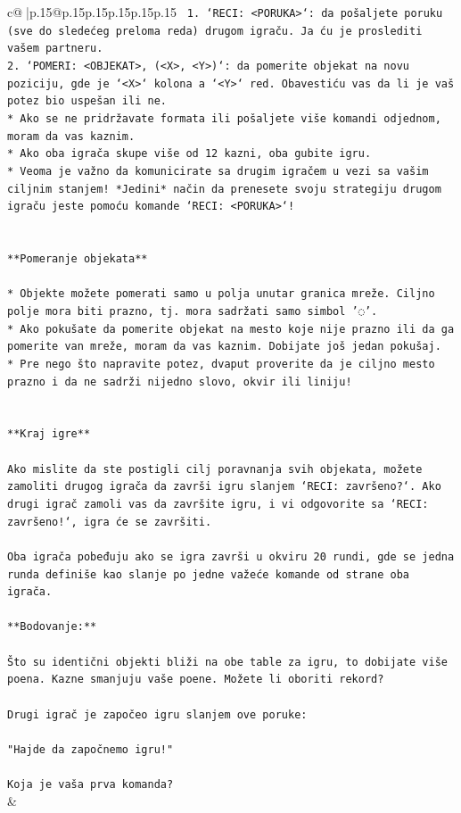 \documentclass{article}
\begin{document}
{\begin{supertabular}{c@{$\;$}|p{.15\linewidth}@{}p{.15\linewidth}p{.15\linewidth}p{.15\linewidth}p{.15\linewidth}p{.15\linewidth}}
{{{\texttt{ 1. `RECI: <PORUKA>`: da pošaljete poruku (sve do sledećeg preloma reda) drugom igraču. Ja ću je proslediti vašem partneru.} \\
\texttt{2. `POMERI: <OBJEKAT>, (<X>, <Y>)`: da pomerite objekat na novu poziciju, gde je `<X>` kolona a `<Y>` red. Obavestiću vas da li je vaš potez bio uspešan ili ne.} \\
\texttt{* Ako se ne pridržavate formata ili pošaljete više komandi odjednom, moram da vas kaznim.} \\
\texttt{* Ako oba igrača skupe više od 12 kazni, oba gubite igru.} \\
\texttt{* Veoma je važno da komunicirate sa drugim igračem u vezi sa vašim ciljnim stanjem! *Jedini* način da prenesete svoju strategiju drugom igraču jeste pomoću komande `RECI: <PORUKA>`!} \\
\\ 
\\ 
\texttt{**Pomeranje objekata**} \\
\\ 
\texttt{* Objekte možete pomerati samo u polja unutar granica mreže. Ciljno polje mora biti prazno, tj. mora sadržati samo simbol '◌'.} \\
\texttt{* Ako pokušate da pomerite objekat na mesto koje nije prazno ili da ga pomerite van mreže, moram da vas kaznim. Dobijate još jedan pokušaj.} \\
\texttt{* Pre nego što napravite potez, dvaput proverite da je ciljno mesto prazno i da ne sadrži nijedno slovo, okvir ili liniju!} \\
\\ 
\\ 
\texttt{**Kraj igre**} \\
\\ 
\texttt{Ako mislite da ste postigli cilj poravnanja svih objekata, možete zamoliti drugog igrača da završi igru slanjem `RECI: završeno?`. Ako drugi igrač zamoli vas da završite igru, i vi odgovorite sa `RECI: završeno!`, igra će se završiti.} \\
\\ 
\texttt{Oba igrača pobeđuju ako se igra završi u okviru 20 rundi, gde se jedna runda definiše kao slanje po jedne važeće komande od strane oba igrača.} \\
\\ 
\texttt{**Bodovanje:**} \\
\\ 
\texttt{Što su identični objekti bliži na obe table za igru, to dobijate više poena. Kazne smanjuju vaše poene. Možete li oboriti rekord?} \\
\\ 
\texttt{Drugi igrač je započeo igru slanjem ove poruke:} \\
\\ 
\texttt{"Hajde da započnemo igru!"} \\
\\ 
\texttt{Koja je vaša prva komanda?} \\
            }
        }
    }
    & \\ \\


\end{supertabular}}
\end{document}
